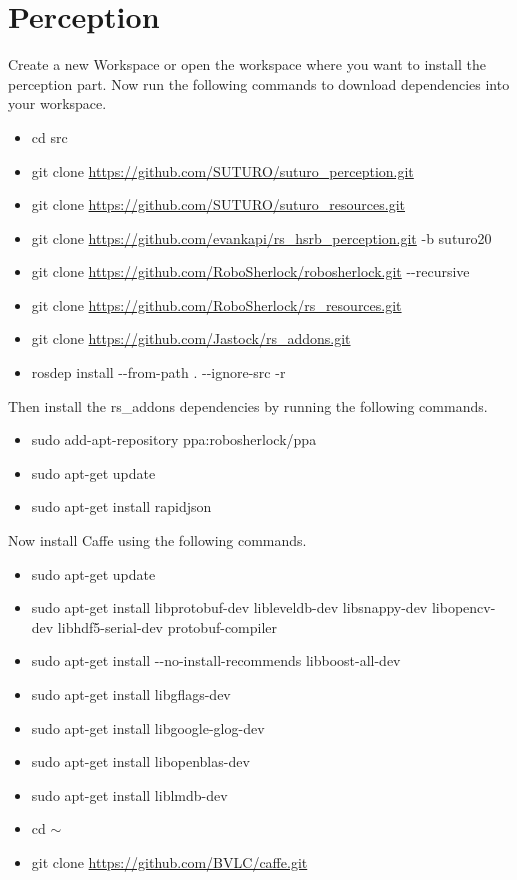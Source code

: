 \documentclass[main.tex]{subfiles}
\begin{document}
 \section{Perception}
 Create a new Workspace or open the workspace where you want to install the perception part. Now run the following commands to download dependencies into your workspace.
 
 \begin{itemize}
\item cd src
\item git clone \url{https://github.com/SUTURO/suturo_perception.git}
\item git clone \url{https://github.com/SUTURO/suturo_resources.git} 
\item git clone \url{https://github.com/evankapi/rs_hsrb_perception.git} -b suturo20
\item git clone \url{https://github.com/RoboSherlock/robosherlock.git} -{}-recursive
\item git clone \url{https://github.com/RoboSherlock/rs_resources.git}
\item git clone \url{https://github.com/Jastock/rs_addons.git}
\item rosdep install -{}-from-path . -{}-ignore-src -r 
\end{itemize}
 
 Then install the rs\_addons dependencies by running the following commands.
 \begin{itemize}
\item sudo add-apt-repository ppa:robosherlock/ppa
\item sudo apt-get update
\item sudo apt-get install rapidjson 
 \end{itemize}
 
 Now install Caffe using the following commands.
 \begin{itemize}
\item sudo apt-get update
\item sudo apt-get install libprotobuf-dev libleveldb-dev libsnappy-dev libopencv-dev libhdf5-serial-dev protobuf-compiler
\item sudo apt-get install -{}-no-install-recommends libboost-all-dev
\item sudo apt-get install libgflags-dev
\item sudo apt-get install libgoogle-glog-dev
\item sudo apt-get install libopenblas-dev
\item sudo apt-get install liblmdb-dev
\item cd $\sim$
\item git clone \url{https://github.com/BVLC/caffe.git}
 \end{itemize}
 
\end{document}
